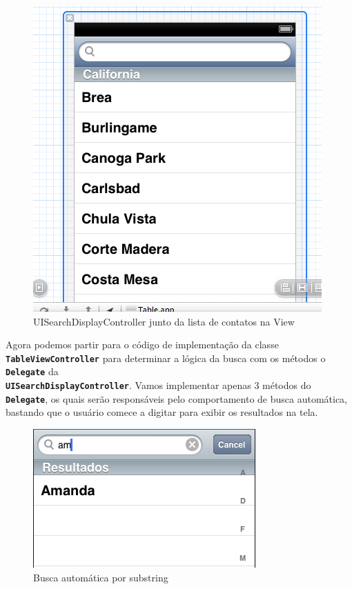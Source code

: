 \documentclass[a4paper,12pt,brazil,doubleside]{book}
\begin{document}
\begin{singlespace}
\begin{figure}[H]
  \centering
  \includegraphics[width=.75\textwidth]{figuras/table/table1.png}
  \caption{UISearchDisplayController junto da lista de contatos na View}
  \label{fig:a}
\end{figure}

Agora podemos partir para o código de implementação da classe \texttt{\textbf{TableViewController}} para determinar a lógica da busca com os métodos o \texttt{\textbf{Delegate}} da\\
\texttt{\textbf{UISearchDisplayController}}. Vamos implementar apenas 3 métodos do \texttt{\textbf{Delegate}}, os quais serão responsáveis pelo comportamento de busca automática, bastando que o usuário comece a digitar para exibir os resultados na tela.

\begin{figure}[H]
  \centering
  \includegraphics[width=.75\textwidth]{figuras/table/table7.png}
  \caption{Busca automática por substring}
  \label{fig:a}
\end{figure}


\end{singlespace}
\end{document}
